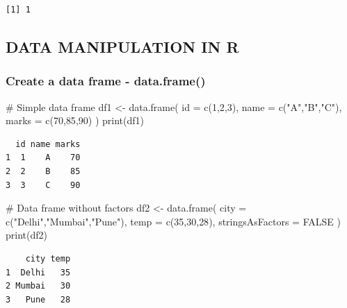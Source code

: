 \documentclass[
  letterpaper,
  DIV=11,
  numbers=noendperiod]{scrartcl}
\newenvironment{Shaded}{\begin{snugshade}}{\end{snugshade}}
\newcommand{\AttributeTok}[1]{\textcolor[rgb]{0.40,0.45,0.13}{#1}}
\newcommand{\CommentTok}[1]{\textcolor[rgb]{0.37,0.37,0.37}{#1}}
\newcommand{\ConstantTok}[1]{\textcolor[rgb]{0.56,0.35,0.01}{#1}}
\newcommand{\DecValTok}[1]{\textcolor[rgb]{0.68,0.00,0.00}{#1}}
\newcommand{\FunctionTok}[1]{\textcolor[rgb]{0.28,0.35,0.67}{#1}}
\newcommand{\NormalTok}[1]{\textcolor[rgb]{0.00,0.23,0.31}{#1}}
\newcommand{\OtherTok}[1]{\textcolor[rgb]{0.00,0.23,0.31}{#1}}
\newcommand{\StringTok}[1]{\textcolor[rgb]{0.13,0.47,0.30}{#1}}
\begin{document}
\begin{verbatim}
[1] 1
\end{verbatim}

\subsection{DATA MANIPULATION IN R}\label{data-manipulation-in-r}

\subsubsection{Create a data frame -
data.frame()}\label{create-a-data-frame---data.frame}

\begin{Shaded}
\begin{Highlighting}[]
\CommentTok{\# Simple data frame}
\NormalTok{df1 }\OtherTok{\textless{}{-}} \FunctionTok{data.frame}\NormalTok{(}
  \AttributeTok{id =} \FunctionTok{c}\NormalTok{(}\DecValTok{1}\NormalTok{,}\DecValTok{2}\NormalTok{,}\DecValTok{3}\NormalTok{),}
  \AttributeTok{name =} \FunctionTok{c}\NormalTok{(}\StringTok{"A"}\NormalTok{,}\StringTok{"B"}\NormalTok{,}\StringTok{"C"}\NormalTok{),}
  \AttributeTok{marks =} \FunctionTok{c}\NormalTok{(}\DecValTok{70}\NormalTok{,}\DecValTok{85}\NormalTok{,}\DecValTok{90}\NormalTok{)}
\NormalTok{)}
\FunctionTok{print}\NormalTok{(df1)}
\end{Highlighting}
\end{Shaded}

\begin{verbatim}
  id name marks
1  1    A    70
2  2    B    85
3  3    C    90
\end{verbatim}

\begin{Shaded}
\begin{Highlighting}[]
\CommentTok{\# Data frame without factors}
\NormalTok{df2 }\OtherTok{\textless{}{-}} \FunctionTok{data.frame}\NormalTok{(}
  \AttributeTok{city =} \FunctionTok{c}\NormalTok{(}\StringTok{"Delhi"}\NormalTok{,}\StringTok{"Mumbai"}\NormalTok{,}\StringTok{"Pune"}\NormalTok{),}
  \AttributeTok{temp =} \FunctionTok{c}\NormalTok{(}\DecValTok{35}\NormalTok{,}\DecValTok{30}\NormalTok{,}\DecValTok{28}\NormalTok{),}
  \AttributeTok{stringsAsFactors =} \ConstantTok{FALSE}
\NormalTok{)}
\FunctionTok{print}\NormalTok{(df2)}
\end{Highlighting}
\end{Shaded}

\begin{verbatim}
    city temp
1  Delhi   35
2 Mumbai   30
3   Pune   28
\end{verbatim}
\end{document}
